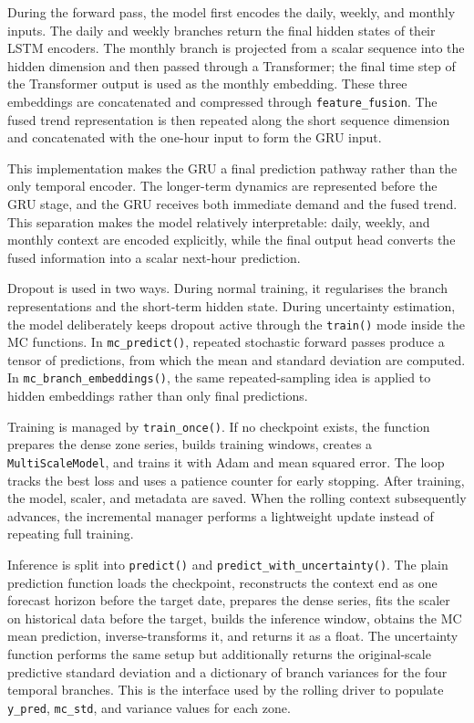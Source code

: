\documentclass[12pt,a4paper]{report}
\begin{document}
	During the forward pass, the model first encodes the daily, weekly, and monthly inputs. The daily and weekly branches return the final hidden states of their LSTM encoders. The monthly branch is projected from a scalar sequence into the hidden dimension and then passed through a Transformer; the final time step of the Transformer output is used as the monthly embedding. These three embeddings are concatenated and compressed through \texttt{feature\_fusion}. The fused trend representation is then repeated along the short sequence dimension and concatenated with the one-hour input to form the GRU input.
	
	This implementation makes the GRU a final prediction pathway rather than the only temporal encoder. The longer-term dynamics are represented before the GRU stage, and the GRU receives both immediate demand and the fused trend. This separation makes the model relatively interpretable: daily, weekly, and monthly context are encoded explicitly, while the final output head converts the fused information into a scalar next-hour prediction.
	
	Dropout is used in two ways. During normal training, it regularises the branch representations and the short-term hidden state. During uncertainty estimation, the model deliberately keeps dropout active through the \texttt{train()} mode inside the MC functions. In \texttt{mc\_predict()}, repeated stochastic forward passes produce a tensor of predictions, from which the mean and standard deviation are computed. In \texttt{mc\_branch\_embeddings()}, the same repeated-sampling idea is applied to hidden embeddings rather than only final predictions.
	
	Training is managed by \texttt{train\_once()}. If no checkpoint exists, the function prepares the dense zone series, builds training windows, creates a \texttt{MultiScaleModel}, and trains it with Adam and mean squared error. The loop tracks the best loss and uses a patience counter for early stopping. After training, the model, scaler, and metadata are saved. When the rolling context subsequently advances, the incremental manager performs a lightweight update instead of repeating full training.
	
	Inference is split into \texttt{predict()} and \texttt{predict\_with\_uncertainty()}. The plain prediction function loads the checkpoint, reconstructs the context end as one forecast horizon before the target date, prepares the dense series, fits the scaler on historical data before the target, builds the inference window, obtains the MC mean prediction, inverse-transforms it, and returns it as a float. The uncertainty function performs the same setup but additionally returns the original-scale predictive standard deviation and a dictionary of branch variances for the four temporal branches. This is the interface used by the rolling driver to populate \texttt{y\_pred}, \texttt{mc\_std}, and variance values for each zone.
	
\end{document}
